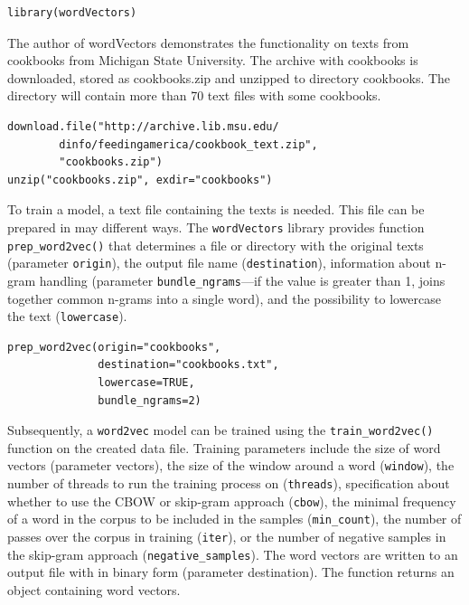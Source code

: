 \documentclass[11pt,openany,executivepaper]{book}
\begin{document}
\begin{verbatim}
library(wordVectors)
\end{verbatim}

The author of wordVectors demonstrates the functionality on texts from cookbooks from Michigan State University. The archive with cookbooks is downloaded, stored as cookbooks.zip and unzipped to directory cookbooks. The directory will contain more than 70 text files with some cookbooks.

\begin{verbatim}
download.file("http://archive.lib.msu.edu/
        dinfo/feedingamerica/cookbook_text.zip",
        "cookbooks.zip")
unzip("cookbooks.zip", exdir="cookbooks")
\end{verbatim}

To train a model, a text file containing the texts is needed. This file can be prepared in may different ways. The \texttt{wordVectors} library provides function \texttt{prep\_word2vec()} that determines a file or directory with the original texts (parameter \texttt{origin}), the output file name (\texttt{destination}), information about n-gram handling (parameter \texttt{bundle\_ngrams}---if the value is greater than 1, joins together common n-grams into a single word), and the possibility to lowercase the text (\texttt{lowercase}).

\begin{verbatim}
prep_word2vec(origin="cookbooks",
              destination="cookbooks.txt",
              lowercase=TRUE,
              bundle_ngrams=2)
\end{verbatim}

Subsequently, a \texttt{word2vec} model can be trained using the \texttt{train\_word2\-vec()}
function on the created data file. Training parameters include the size of word
vectors (parameter vectors), the size of the window around a word (\texttt{window}),
the number of threads to run the training process on (\texttt{threads}), specification
about whether to use the CBOW or skip-gram approach (\texttt{cbow}), the minimal
frequency of a word in the corpus to be included in the samples (\texttt{min\_count}), the number of passes over the corpus in training (\texttt{iter}), or the number of negative samples in the skip-gram approach (\texttt{negative\_samples}). The word vectors are written to an output file with in binary form (parameter destination). The function returns an object containing word vectors.

\vspace{0.5em}
\end{document}
